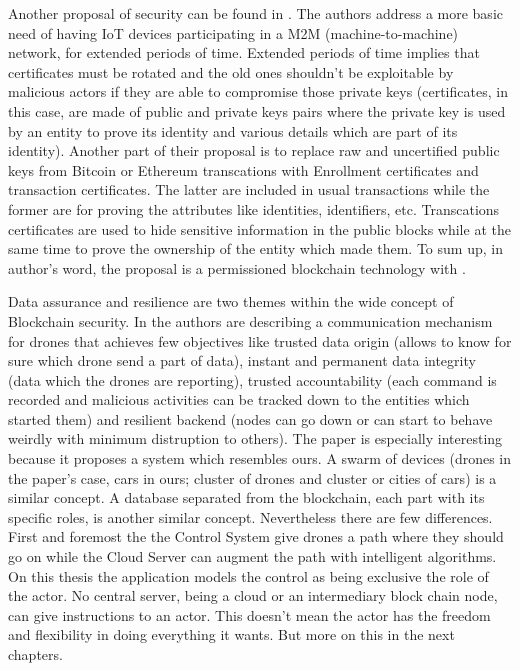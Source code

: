 \documentclass[a4paper,12pt,twoside]{book}
\begin{document}
    Another proposal of security can be found in \cite{SecuringUserIdentity}. The authors address a more basic need of having IoT devices participating in a M2M (machine-to-machine) network, for extended periods of time. Extended periods of time implies that certificates must be rotated and the old ones shouldn't be exploitable by malicious actors if they are able to compromise those private keys (certificates, in this case, are made of public and private keys pairs where the private key is used by an entity to prove its identity and various details which are part of its identity). Another part of their proposal is to replace raw and uncertified public keys from Bitcoin or Ethereum transcations with Enrollment certificates and transaction certificates. The latter are included in usual transactions while the former are for proving the attributes like identities, identifiers, etc. Transcations certificates are used to hide sensitive information in the public blocks while at the same time to prove the ownership of the entity which made them. To sum up, in author's word, the proposal is a permissioned blockchain technology with .

    Data assurance and resilience are two themes within the wide concept of Blockchain security. In \cite{TowardsdatAassuranceAndResilience} the authors are describing a communication mechanism for drones that achieves few objectives like trusted data origin (allows to know for sure which drone send a part of data), instant and permanent data integrity (data which the drones are reporting), trusted accountability (each command is recorded and malicious activities can be tracked down to the entities which started them) and resilient backend (nodes can go down or can start to behave weirdly with minimum distruption to others). The paper is especially interesting because it proposes a system which resembles ours. A swarm of devices (drones in the paper's case, cars in ours; cluster of drones and cluster or cities of cars) is a similar concept. A database separated from the blockchain, each part with its specific roles, is another similar concept. Nevertheless there are few differences. First and foremost the the Control System give drones a path where they should go on while the Cloud Server can augment the path with intelligent algorithms. On this thesis the application models the control as being exclusive the role of the actor. No central server, being a cloud or an intermediary block chain node, can give instructions to an actor. This doesn't mean the actor has the freedom and flexibility in doing everything it wants. But more on this in the next chapters.
\end{document}
